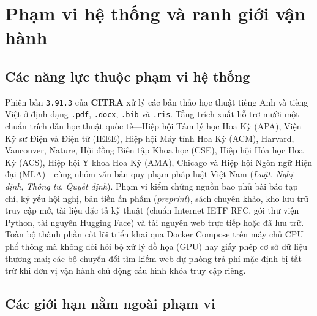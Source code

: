 \section{Phạm vi hệ thống và ranh giới vận hành}

\subsection{Các năng lực thuộc phạm vi hệ thống}

Phiên bản \texttt{3.91.3} của \textbf{CITRA} xử lý các bản thảo học thuật tiếng Anh và tiếng Việt ở định dạng \texttt{.pdf}, \texttt{.docx}, \texttt{.bib} và \texttt{.ris}. Tầng trích xuất hỗ trợ mười một chuẩn trích dẫn học thuật quốc tế---Hiệp hội Tâm lý học Hoa Kỳ (APA), Viện Kỹ sư Điện và Điện tử (IEEE), Hiệp hội Máy tính Hoa Kỳ (ACM), Harvard, Vancouver, Nature, Hội đồng Biên tập Khoa học (CSE), Hiệp hội Hóa học Hoa Kỳ (ACS), Hiệp hội Y khoa Hoa Kỳ (AMA), Chicago và Hiệp hội Ngôn ngữ Hiện đại (MLA)---cùng nhóm văn bản quy phạm pháp luật Việt Nam (\textit{Luật}, \textit{Nghị định}, \textit{Thông tư}, \textit{Quyết định}). Phạm vi kiểm chứng nguồn bao phủ bài báo tạp chí, kỷ yếu hội nghị, bản tiền ấn phẩm (\textit{preprint}), sách chuyên khảo, kho lưu trữ truy cập mở, tài liệu đặc tả kỹ thuật (chuẩn Internet IETF RFC, gói thư viện Python, tài nguyên Hugging Face) và tài nguyên web trực tiếp hoặc đã lưu trữ. Toàn bộ thành phần cốt lõi triển khai qua Docker Compose trên máy chủ CPU phổ thông mà không đòi hỏi bộ xử lý đồ họa (GPU) hay giấy phép cơ sở dữ liệu thương mại; các bộ chuyển đổi tìm kiếm web dự phòng trả phí mặc định bị tắt trừ khi đơn vị vận hành chủ động cấu hình khóa truy cập riêng.

\subsection{Các giới hạn nằm ngoài phạm vi}


